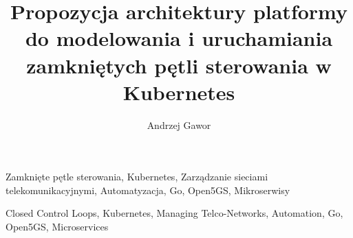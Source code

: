 \documentclass[
    bindingoffset=5mm,  %
    footnoteindent=3mm, %
    hyphenation=true    %
]{src/wut-thesis}
\begin{document}
\title{
    Propozycja architektury platformy do modelowania i uruchamiania zamkniętych pętli sterowania w Kubernetes
}
\author{Andrzej Gawor}
\date{\the\year}
\maketitle

\cleardoublepage
\abstract

\keywords Zamknięte pętle sterowania, Kubernetes, Zarządzanie sieciami telekomunikacyjnymi, Automatyzacja, Go, Open5GS, Mikroserwisy

\clearpage
\secondabstract

\secondkeywords Closed Control Loops, Kubernetes, Managing Telco-Networks, Automation, Go, Open5GS, Microservices

\pagestyle{plain}

\cleardoublepage
\tableofcontents

\cleardoublepage 
\pagestyle{headings}






\cleardoublepage 
\printbibliography



\newpage
\pagestyle{plain}


\listoffigurestoc    
\vspace{1cm}         
\listoftablestoc     
\vspace{1cm}         
\listofappendicestoc 

\setcounter{tocdepth}{1}

\end{document}
